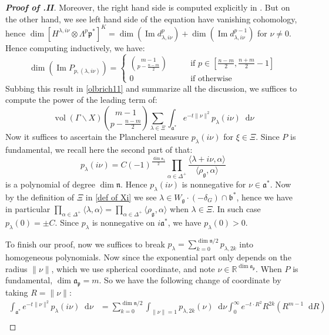 \documentclass[11pt]{report}
\theoremstyle{definition}
\theoremstyle{plain}
\DeclareMathOperator{\im}{Im}
\DeclareMathOperator{\vol}{vol}
\newcommand{\real}{\mathbb{R}}
\newcommand{\brac}[1]{\langle #1 \rangle}
\newcommand{\norm}[1]{\lVert #1 \rVert}
\newcommand{\mass}[1]{\mathop{}\mathrm{d}{#1}}
\newcommand{\Lie}[1]{\mathfrak{#1}}
\begin{document}
\begin{proof}[\textbf{Proof of .II}]
Moreover, the right hand side is computed explicitly in . But on the other hand, we see left hand side of the equation have vanishing cohomology, hence $\dim[H^{\lambda,i\nu}\otimes \Lambda^p\Lie{p}^*]^K=\dim (\im d^p_{\lambda, i\nu})+\dim (\im d^{p-1}_{\lambda, i\nu})$ for $\nu\neq 0$. Hence computing inductively, we have:
\begin{equation}
\dim(\im P_{p, (\lambda, i\nu)})=\begin{cases}
{m-1 \choose p-\frac{n-m}{2}} \qquad &\text{if $p\in [\frac{n-m}{2}, \frac{n+m}{2}-1]$}\\
0 \qquad &\text{if otherwise}
\end{cases}
\end{equation}
Subbing this result in \ref{olbrich11} and summarize all the discussion, we suffices to compute the power of the leading term of:
\begin{equation*}
\vol(\Gamma\backslash X){m-1 \choose p-\frac{n-m}{2}}\sum_{\lambda\in \Xi}^{}\int_{\Lie{a}^*}^{}e^{-t\norm{\nu}^2}p_{\lambda}(i\nu)\mass{\nu}
\end{equation*}
Now it suffices to ascertain the Plancherel measure $p_{\lambda}(i\nu)$ for $\xi\in \Xi$. Since $P$ is fundamental, we recall here the second part of  that:
\begin{equation}
p_\lambda(i\nu)=C(-1)^{\frac{\dim \Lie{n}_1}{2}}\prod_{\alpha\in \Delta^+}\frac{\brac{\lambda+i\nu, \alpha}}{\brac{\rho_{\Lie{g}},\alpha}}
\end{equation}
is a polynomial of degree $\dim \Lie{n}$. Hence $p_{\lambda}(i\nu)$ is nonnegative for $\nu\in \Lie{a}^*$. Now by the definition of $\Xi$ in \ref{def of Xi} we see $\lambda\in W_\Lie{g}\cdot (-\delta_G)\cap \Lie{b}^*$, hence we have in particular $\prod_{\alpha\in \Delta^+}\brac{\lambda, \alpha}=\prod_{\alpha\in \Delta^+}\brac{\rho_{\Lie{g}}, \alpha}$ when $\lambda\in \Xi$. In such case $p_{\lambda}(0)=\pm C$. Since $p_\lambda$ is nonnegative on $i\Lie{a}^*$, we have $p_\lambda(0)>0$. 
\par To finish our proof, now we suffices to break $p_\lambda=\sum_{k=0}^{\dim\Lie{n}/2}p_{\lambda, 2k}$ into homogeneous polynomials. Now since the exponential part only depends on the radius $\norm{\nu}$, which we use spherical coordinate, and note $\nu\in \real^{\dim \Lie {a_p}}$. When $P$ is fundamental, $\dim\Lie{a_p}=m$. So we have the following change of coordinate by taking $R=\norm{\nu}$:
\begin{equation*}
\begin{split} \int_{\Lie{a}^*}^{}e^{-t\norm{\nu}^2}p_{\lambda}(i\nu)\mass{\nu}&=\sum_{k=0}^{\dim\Lie{n}/2}\int_{\norm{\nu}=1}^{}p_{\lambda, 2k}(\nu)\mass{\nu}\int_{0}^{\infty}e^{-t\cdot R^2}R^{2k}(R^{m-1}\mass{R})\\

\end{split}
\end{equation*}
\end{proof}
\end{document}
